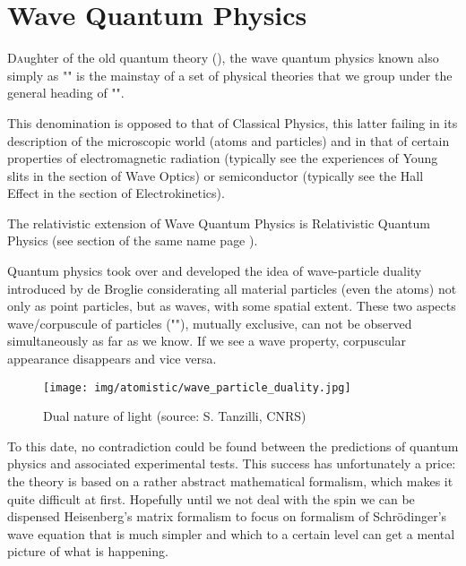 	\section{Wave Quantum Physics}\label{wave quantum physics}
	\lettrine[lines=4]{\color{BrickRed}D}aughter of the old quantum theory (), the wave quantum physics known also simply as "" is the mainstay of a set of physical theories that we group under the general heading of "".
	
	This denomination is opposed to that of Classical Physics, this latter failing in its description of the microscopic world (atoms and particles) and in that of certain properties of electromagnetic radiation (typically see the experiences of Young slits in the section of Wave Optics) or semiconductor (typically see the Hall Effect in the section of Electrokinetics).
	
	\begin{tcolorbox}[title=Remark,colframe=black,arc=10pt]
	The relativistic extension of Wave Quantum Physics is Relativistic Quantum Physics (see section of the same name page \pageref{relativistic quantum physics}).
	\end{tcolorbox}
	
	Quantum physics took over and developed the idea of wave-particle duality introduced by de Broglie considerating all material particles (even the atoms) not only as point particles, but as waves, with some spatial extent. These two aspects wave/corpuscule of particles (""), mutually exclusive, can not be observed simultaneously as far as we know. If we see a wave property, corpuscular appearance disappears and vice versa.
	\begin{figure}[H]
		\centering
		\texttt{[image: img/atomistic/wave\_particle\_duality.jpg]}
		\caption[Dual nature of light]{Dual nature of light (source: S. Tanzilli, CNRS)}
	\end{figure}
	To this date, no contradiction could be found between the predictions of quantum physics and associated experimental tests. This success has unfortunately a price: the theory is based on a rather abstract mathematical formalism, which makes it quite difficult at first. Hopefully until we not deal with the spin we can be dispensed Heisenberg's matrix formalism to focus on formalism of Schrödinger's wave equation that is much simpler and which to a certain level can get a mental picture of what is happening.
	
